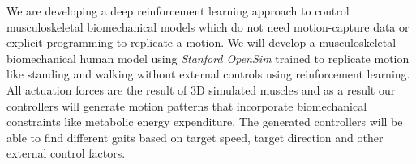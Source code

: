 
We are developing a deep reinforcement learning approach to control
musculoskeletal biomechanical models which do not need motion-capture data or
explicit programming to replicate a motion. We will develop a musculoskeletal
biomechanical human model using \emph{Stanford OpenSim} \cite{delp2007opensim}
trained to replicate motion like standing and walking without external controls
using reinforcement learning. All actuation forces are the result of 3D
simulated muscles and as a result our controllers will generate motion patterns that
incorporate biomechanical constraints like metabolic energy expenditure. The
generated controllers will be able to find different gaits based on target
speed, target direction and other external control factors.
